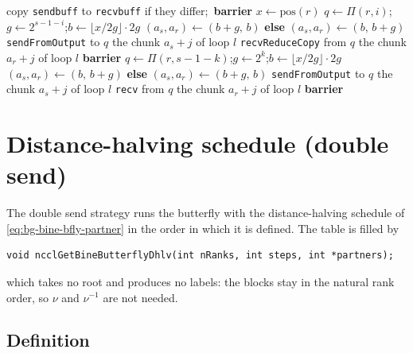 \begin{algorithm}[t]
\caption{\bine{} allreduce, kernel of one channel.}
\label{alg:bfly-allreduce}
\begin{algorithmic}[1]
\State copy \texttt{sendbuff} to \texttt{recvbuff} if they differ;\ \textbf{barrier}
\State $x\gets\mathrm{pos}(r)$
  \State $q\gets\Pi(r,i)$;\quad $g\gets2^{s-1-i}$;\quad $b\gets\lfloor x/2g\rfloor\cdot2g$
   $(a_s,a_r)\gets(b+g,\,b)$ \textbf{else} $(a_s,a_r)\gets(b,\,b+g)$ \EndIf
    \State \texttt{sendFromOutput} to $q$ the chunk $a_s+j$ of loop $l$
    \State \texttt{recvReduceCopy} from $q$ the chunk $a_r+j$ of loop $l$
  \EndFor
  \State \textbf{barrier}
\EndFor
{}
  \State $q\gets\Pi(r,s-1-k)$;\quad $g\gets2^k$;\quad $b\gets\lfloor x/2g\rfloor\cdot2g$
   $(a_s,a_r)\gets(b,\,b+g)$ \textbf{else} $(a_s,a_r)\gets(b+g,\,b)$ \EndIf
    \State \texttt{sendFromOutput} to $q$ the chunk $a_s+j$ of loop $l$
    \State \texttt{recv} from $q$ the chunk $a_r+j$ of loop $l$
  \EndFor
  \State \textbf{barrier}
\EndFor
\end{algorithmic}
\end{algorithm}

\section{Distance-halving schedule (double send)}\label{sec:bfly-dhlv}

The double send strategy runs the butterfly with the distance-halving schedule of \cref{eq:bg-bine-bfly-partner} in the order in which it is defined.
The table is filled by
\begin{verbatim}
void ncclGetBineButterflyDhlv(int nRanks, int steps, int *partners);
\end{verbatim}
which takes no root and produces no labels: the blocks stay in the natural rank order, so $\nu$ and $\nu^{-1}$ are not needed.

\subsection{Definition}

